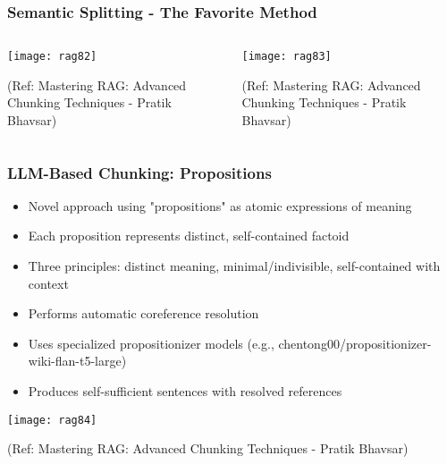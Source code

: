 \begin{frame}[fragile]\frametitle{Semantic Splitting - The Favorite Method}

 \begin{columns}
    \begin{column}[T]{0.5\linewidth}
  	\begin{center}
	\texttt{[image: rag82]}
		
	{\tiny (Ref: Mastering RAG: Advanced Chunking Techniques - Pratik Bhavsar)}
	
	\end{center}

    \end{column}
    \begin{column}[T]{0.5\linewidth}
  	\begin{center}
	\texttt{[image: rag83]}
	
	{\tiny (Ref: Mastering RAG: Advanced Chunking Techniques - Pratik Bhavsar)}
	
	\end{center}
    \end{column}
  \end{columns}
  
\end{frame}


\begin{frame}[fragile]\frametitle{LLM-Based Chunking: Propositions}
      \begin{itemize}
\item Novel approach using "propositions" as atomic expressions of meaning
\item Each proposition represents distinct, self-contained factoid
\item Three principles: distinct meaning, minimal/indivisible, self-contained with context
\item Performs automatic coreference resolution
\item Uses specialized propositionizer models (e.g., chentong00/propositionizer-wiki-flan-t5-large)
\item Produces self-sufficient sentences with resolved references
  \end{itemize}
  
  	\begin{center}
	\texttt{[image: rag84]}
	
	{\tiny (Ref: Mastering RAG: Advanced Chunking Techniques - Pratik Bhavsar)}
	
	\end{center}  
\end{frame}

